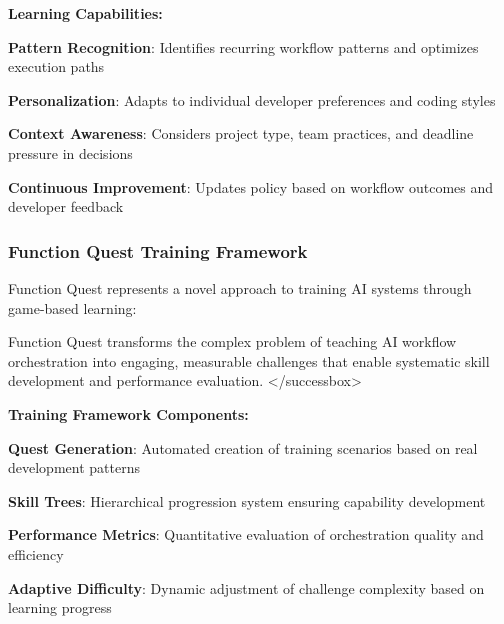 \begin{successbox}
\begin{alertbox}
\textbf{Learning Capabilities:}

\begin{expandedlist}
    \item \textbf{Pattern Recognition}: Identifies recurring workflow patterns and optimizes execution paths
    
    \item \textbf{Personalization}: Adapts to individual developer preferences and coding styles
    
    \item \textbf{Context Awareness}: Considers project type, team practices, and deadline pressure in decisions
    
    \item \textbf{Continuous Improvement}: Updates policy based on workflow outcomes and developer feedback
\end{expandedlist}

\subsubsection{Function Quest Training Framework}

Function Quest represents a novel approach to training AI systems through game-based learning:

\begin{successbox}
Function Quest transforms the complex problem of teaching AI workflow orchestration into engaging, measurable challenges that enable systematic skill development and performance evaluation.
</successbox>

\textbf{Training Framework Components:}

\begin{expandedlist}
    \item \textbf{Quest Generation}: Automated creation of training scenarios based on real development patterns
    
    \item \textbf{Skill Trees}: Hierarchical progression system ensuring capability development
    
    \item \textbf{Performance Metrics}: Quantitative evaluation of orchestration quality and efficiency
    
    \item \textbf{Adaptive Difficulty}: Dynamic adjustment of challenge complexity based on learning progress
\end{expandedlist}


\end{successbox}
\end{alertbox}
\end{successbox}

